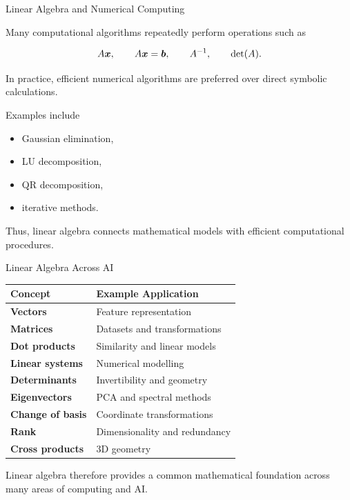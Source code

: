 \begin{frame}{Linear Algebra and Numerical Computing}

Many computational algorithms repeatedly perform operations
such as

\[
A\bm{x},
\qquad
A\bm{x}=\bm{b},
\qquad
A^{-1},
\qquad
\det(A).
\]

In practice, efficient numerical algorithms are preferred
over direct symbolic calculations.

Examples include

\begin{itemize}
    \item Gaussian elimination,
    \item LU decomposition,
    \item QR decomposition,
    \item iterative methods.
\end{itemize}

Thus, linear algebra connects mathematical models with
efficient computational procedures.

\end{frame}



\begin{frame}{Linear Algebra Across AI}

\begin{center}

\begin{tabular}{>{\bfseries}l l}
\toprule
Concept & Example Application\\
\midrule
Vectors & Feature representation\\
Matrices & Datasets and transformations\\
Dot products & Similarity and linear models\\
Linear systems & Numerical modelling\\
Determinants & Invertibility and geometry\\
Eigenvectors & PCA and spectral methods\\
Change of basis & Coordinate transformations\\
Rank & Dimensionality and redundancy\\
Cross products & 3D geometry\\
\bottomrule
\end{tabular}

\end{center}

\vspace{0.4cm}

Linear algebra therefore provides a common mathematical
foundation across many areas of computing and AI.

\end{frame}